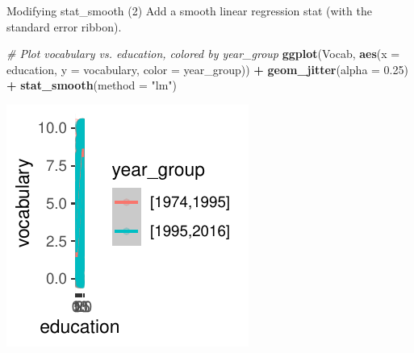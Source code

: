 \documentclass[
  ignorenonframetext,
]{beamer}
\newenvironment{Shaded}{\begin{snugshade}}{\end{snugshade}}
\newcommand{\AttributeTok}[1]{\textcolor[rgb]{0.13,0.29,0.53}{#1}}
\newcommand{\CommentTok}[1]{\textcolor[rgb]{0.56,0.35,0.01}{\textit{#1}}}
\newcommand{\FloatTok}[1]{\textcolor[rgb]{0.00,0.00,0.81}{#1}}
\newcommand{\FunctionTok}[1]{\textcolor[rgb]{0.13,0.29,0.53}{\textbf{#1}}}
\newcommand{\NormalTok}[1]{#1}
\newcommand{\SpecialCharTok}[1]{\textcolor[rgb]{0.81,0.36,0.00}{\textbf{#1}}}
\newcommand{\StringTok}[1]{\textcolor[rgb]{0.31,0.60,0.02}{#1}}
\begin{document}
\begin{frame}[fragile]{Modifying stat\_smooth (2)}
\label{modifying-stat_smooth-2-3}
Add a smooth linear regression stat (with the standard error ribbon).


\begin{Shaded}
\begin{Highlighting}[]
\CommentTok{\# Plot vocabulary vs. education, colored by year\_group}
\FunctionTok{ggplot}\NormalTok{(Vocab, }\FunctionTok{aes}\NormalTok{(}\AttributeTok{x =}\NormalTok{ education, }\AttributeTok{y =}\NormalTok{ vocabulary, }\AttributeTok{color =}\NormalTok{ year\_group)) }\SpecialCharTok{+}
    \FunctionTok{geom\_jitter}\NormalTok{(}\AttributeTok{alpha =} \FloatTok{0.25}\NormalTok{) }\SpecialCharTok{+} \FunctionTok{stat\_smooth}\NormalTok{(}\AttributeTok{method =} \StringTok{"lm"}\NormalTok{)}
\end{Highlighting}
\end{Shaded}

\begin{center}\includegraphics[width=0.5\linewidth]{Figs/unnamed-chunk-16-1} \end{center}
\end{frame}
\end{document}
